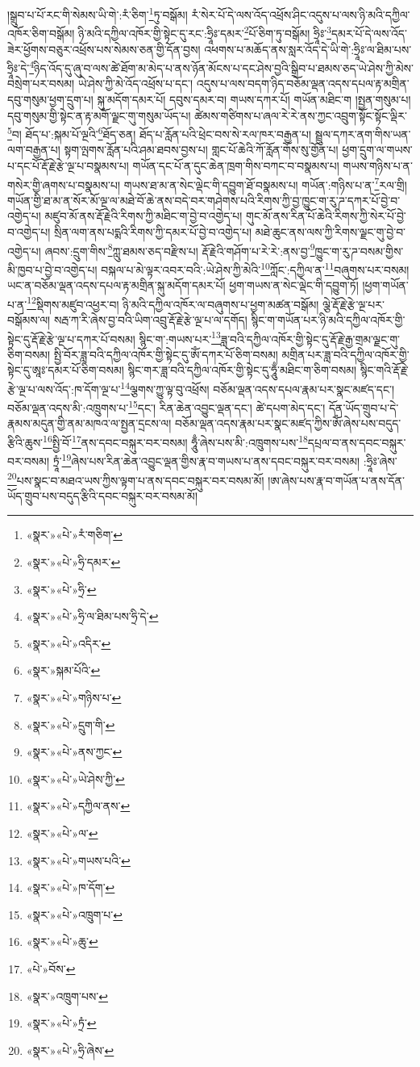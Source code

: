 །སྒྲུབ་པ་པོ་རང་གི་སེམས་ཡི་གེ་:རཾ་ཅིག་\footnote{«སྣར་»«པེ་»རཾ་གཅིག་}ཏུ་བསྒོམ། རཾ་སེར་པོ་དེ་ལས་འོད་འཕྲོས་ཤིང་འདུས་པ་ལས་ཉི་མའི་དཀྱིལ་འཁོར་ཅིག་བསྒོམ། ཉི་མའི་དཀྱིལ་འཁོར་གྱི་སྟེང་དུ་རང་:ཧྲཱིཿ་དམར་\footnote{«སྣར་»«པེ་»ཧྲི་དམར་}པོ་ཅིག་ཏུ་བསྒོམ། ཧྲཱིཿ་\footnote{«སྣར་»«པེ་»ཧྲི་}དམར་པོ་དེ་ལས་འོད་ཟེར་ཕྱོགས་བཅུར་འཕྲོས་པས་སེམས་ཅན་གྱི་དོན་བྱས། འཕགས་པ་མཆོད་ནས་སླར་འོད་དེ་ཡི་གེ་:ཧྲཱིཿ་ལ་ཐིམ་པས་ཧྲཱིཿ་དེ་\footnote{«སྣར་»«པེ་»ཧྲི་ལ་ཐིམ་པས་ཧྲི་དེ་}ཉིད་འོད་དུ་ཞུ་བ་ལས་ཚེ་ཐོག་མ་མེད་པ་ནས་ཉོན་མོངས་པ་དང་ཤེས་བྱའི་སྒྲིབ་པ་ཐམས་ཅད་ཡེ་ཤེས་ཀྱི་མེས་བསྲེག་པར་བསམ། ཡེ་ཤེས་ཀྱི་མེ་འོད་འཕྲོས་པ་དང་། འདུས་པ་ལས་བདག་ཉིད་བཅོམ་ལྡན་འདས་དཔལ་རྟ་མགྲིན་དབུ་གསུམ་ཕྱག་དྲུག་པ། སྐུ་མདོག་དམར་པོ། དབུས་དམར་བ། གཡས་དཀར་པོ། གཡོན་མཐིང་ག །སྤྱན་གསུམ་པ། དབུ་གསུམ་གྱི་སྟེང་ན་རྟ་མགོ་ལྗང་གུ་གསུམ་ཡོད་པ། ཚེམས་གཙིགས་པ་ཞལ་རེ་རེ་ནས་ཀྱང་འབྲུག་སྟོང་སྟོང་ལྡིར་\footnote{«སྣར་»«པེ་»འདིར་}བ། ཐོད་པ་:སྐམ་པོ་ལྔའི་\footnote{«སྣར་»སྐམ་པོའི་}ཐོད་ཅན། ཐོད་པ་རློན་པའི་ཕྲེང་བས་སེ་རལ་ཁར་བརྒྱན་པ། སྦྲུལ་དཀར་ནག་གིས་ཡན་ལག་བརྒྱན་པ། སྟག་ལྤགས་རློན་པའི་ཤམ་ཐབས་བྱས་པ། གླང་པོ་ཆེའི་ཀོ་རློན་གོས་སུ་གྱོན་པ། ཕྱག་དྲུག་ལ་གཡས་པ་དང་པོ་རྡོ་རྗེ་རྩེ་ལྔ་པ་བསྣམས་པ། གཡོན་དང་པོ་ན་དུང་ཆེན་ཁྲག་གིས་བཀང་བ་བསྣམས་པ། གཡས་གཉིས་པ་ན་གསེར་གྱི་ཞགས་པ་བསྣམས་པ། གཡས་ཐ་མ་ན་སེང་ལྡེང་གི་དབྱུག་ཐོ་བསྣམས་པ། གཡོན་:གཉིས་པ་ན་\footnote{«སྣར་»«པེ་»གཉིས་པ་}རལ་གྲི། གཡོན་གྱི་ཐ་མ་ན་སོར་མོ་ལྔ་ལ་མཐེ་བོ་ཆེ་ནས་བདེ་བར་གཤེགས་པའི་རིགས་ཀྱི་བྱ་ཁྱུང་ག་རུ་ཌ་དཀར་པོ་བྱེ་བ་འགྱེད་པ། མཛུབ་མོ་ནས་རྡོ་རྗེའི་རིགས་ཀྱི་མཐིང་ག་བྱེ་བ་འགྱེད་པ། གུང་མོ་ནས་རིན་པོ་ཆེའི་རིགས་ཀྱི་སེར་པོ་བྱེ་བ་འགྱེད་པ། སྲིན་ལག་ནས་པདྨའི་རིགས་ཀྱི་དམར་པོ་བྱེ་བ་འགྱེད་པ། མཐེ་ཆུང་ནས་ལས་ཀྱི་རིགས་ལྗང་གུ་བྱེ་བ་འགྱེད་པ། ཞབས་:དྲུག་གིས་\footnote{«སྣར་»«པེ་»དྲུག་གི་}ཀླུ་ཐམས་ཅད་བརྫིས་པ། རྡོ་རྗེའི་གཤོག་པ་རེ་རེ་:ནས་བྱ་\footnote{«སྣར་»«པེ་»ནས་ཀྱང་}ཁྱུང་ག་རུ་ཌ་བསམ་གྱིས་མི་ཁྱབ་པ་བྱེ་བ་འགྱེད་པ། བསྐལ་པ་མེ་ལྟར་འབར་བའི་:ཡེ་ཤེས་ཀྱི་མེའི་\footnote{«སྣར་»«པེ་»ཡེ་ཤེས་ཀྱི་}ཀློང་:དཀྱིལ་ན་\footnote{«སྣར་»«པེ་»དཀྱིལ་ནས་}བཞུགས་པར་བསམ། ཡང་ན་བཅོམ་ལྡན་འདས་དཔལ་རྟ་མགྲིན་སྐུ་མདོག་དམར་པོ། ཕྱག་གཡས་ན་སེང་ལྡེང་གི་དབྱུག་ཏོ། །ཕྱག་གཡོན་པ་ན་\footnote{«སྣར་»«པེ་»ལ་}སྡིགས་མཛུབ་འཕྱར་བ། ཉི་མའི་དཀྱིལ་འཁོར་ལ་བཞུགས་པ་ཕྱག་མཚན་བསྒོམ། ལྕེ་རྡོ་རྗེ་རྩེ་ལྔ་པར་བསྒོམས་ལ། སརྦ་ཀ་རི་ཞེས་བྱ་བའི་ཡིག་འབྲུ་རྡོ་རྗེ་རྩེ་ལྔ་པ་ལ་དགོད། སྙིང་ག་གཡོན་པར་ཉི་མའི་དཀྱིལ་འཁོར་གྱི་སྟེང་དུ་རྡོ་རྗེ་རྩེ་ལྔ་པ་དཀར་པོ་བསམ། སྙིང་ག་:གཡས་པར་\footnote{«སྣར་»«པེ་»གཡས་པའི་}ཟླ་བའི་དཀྱིལ་འཁོར་གྱི་སྟེང་དུ་རྡོ་རྗེ་རྒྱ་གྲམ་ལྗང་གུ་ཅིག་བསམ། སྤྱི་བོར་ཟླ་བའི་དཀྱིལ་འཁོར་གྱི་སྟེང་དུ་ཨོཾ་དཀར་པོ་ཅིག་བསམ། མགྲིན་པར་ཟླ་བའི་དཀྱིལ་འཁོར་གྱི་སྟེང་དུ་ཨཱཿ་དམར་པོ་ཅིག་བསམ། སྙིང་གར་ཟླ་བའི་དཀྱིལ་འཁོར་གྱི་སྟེང་དུ་ཧཱུྃ་མཐིང་ག་ཅིག་བསམ། སྙིང་གའི་རྡོ་རྗེ་རྩེ་ལྔ་པ་ལས་འོད་:ཁ་དོག་ལྔ་པ་\footnote{«སྣར་»«པེ་»ཁ་དོག་}ལྕགས་ཀྱུ་ལྟ་བུ་འཕྲོས། བཅོམ་ལྡན་འདས་དཔལ་རྣམ་པར་སྣང་མཛད་དང་། བཅོམ་ལྡན་འདས་མི་:འཁྲུགས་པ་\footnote{«སྣར་»«པེ་»འཁྲུག་པ་}དང་། རིན་ཆེན་འབྱུང་ལྡན་དང་། ཚེ་དཔག་མེད་དང་། དོན་ཡོད་གྲུབ་པ་དེ་རྣམས་མདུན་གྱི་ནམ་མཁའ་ལ་སྤྱན་དྲངས་ལ། བཅོམ་ལྡན་འདས་རྣམ་པར་སྣང་མཛད་ཀྱིས་ཨོཾ་ཞེས་པས་བདུད་རྩིའི་ཆུས་\footnote{«སྣར་»«པེ་»ཆུ་}སྤྱི་བོ་\footnote{«པེ་»བོས་}ནས་དབང་བསྐུར་བར་བསམ། ཧཱུྃ་ཞེས་པས་མི་:འཁྲུགས་པས་\footnote{«སྣར་»འཁྲུག་པས་}དཔྲལ་བ་ནས་དབང་བསྐུར་བར་བསམ། ཏྲཱཾ་\footnote{«སྣར་»«པེ་»ཏྲཾ་}ཞེས་པས་རིན་ཆེན་འབྱུང་ལྡན་གྱིས་རྣ་བ་གཡས་པ་ནས་དབང་བསྐུར་བར་བསམ། :ཧྲཱིཿ་ཞེས་\footnote{«སྣར་»«པེ་»ཧྲི་ཞེས་}པས་སྣང་བ་མཐའ་ཡས་ཀྱིས་ལྟག་པ་ནས་དབང་བསྐུར་བར་བསམ་མོ། །ཨ་ཞེས་པས་རྣ་བ་གཡོན་པ་ནས་དོན་ཡོད་གྲུབ་པས་བདུད་རྩིའི་དབང་བསྐུར་བར་བསམ་མོ། 